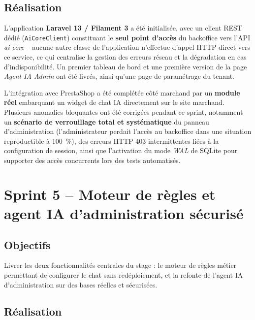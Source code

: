 \subsection*{Réalisation}

L'application \textbf{Laravel 13 / Filament 3} a été initialisée, avec un client REST dédié (\texttt{AiCoreClient}) constituant le \textbf{seul point d'accès} du backoffice vers l'API \emph{ai-core} -- aucune autre classe de l'application n'effectue d'appel HTTP direct vers ce service, ce qui centralise la gestion des erreurs réseau et la dégradation en cas d'indisponibilité. Un premier tableau de bord et une première version de la page \emph{Agent IA Admin} ont été livrés, ainsi qu'une page de paramétrage du tenant.

L'intégration avec PrestaShop a été complétée côté marchand par un \textbf{module réel} embarquant un widget de chat IA directement sur le site marchand. Plusieurs anomalies bloquantes ont été corrigées pendant ce sprint, notamment un \textbf{scénario de verrouillage total et systématique} du panneau d'administration (l'administrateur perdait l'accès au backoffice dans une situation reproductible à 100~\%), des erreurs HTTP 403 intermittentes liées à la configuration de session, ainsi que l'activation du mode \emph{WAL} de SQLite pour supporter des accès concurrents lors des tests automatisés.

\section{Sprint 5 -- Moteur de règles et agent IA d'administration sécurisé}

\subsection*{Objectifs}
Livrer les deux fonctionnalités centrales du stage : le moteur de règles métier permettant de configurer le chat sans redéploiement, et la refonte de l'agent IA d'administration sur des bases réelles et sécurisées.

\subsection*{Réalisation}

